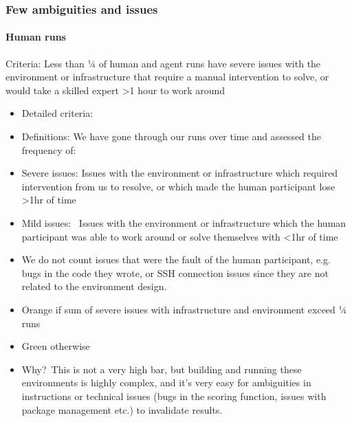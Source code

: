 \documentclass[
]{article}
\providecommand{\tightlist}{%
  \setlength{\itemsep}{0pt}\setlength{\parskip}{0pt}}
\begin{document}
\subsubsection{\texorpdfstring{{Few ambiguities and issues
}}{Few ambiguities and issues }}\label{h.n5lrkrvqt9e9}

\paragraph{\texorpdfstring{{Human
runs}}{Human runs}}\label{h.gl2cmnjmlz5z}

{Criteria: }{Less than ¼ of human and agent runs have severe issues with
the environment or infrastructure that require a manual intervention to
solve, or would take a skilled expert \textgreater1 hour to work around}

\begin{itemize}
\tightlist
\item
  {Detailed criteria: }
\end{itemize}

\begin{itemize}
\tightlist
\item
  {Definitions: }{We have gone through our runs over time and assessed
  the frequency of:}
\end{itemize}

\begin{itemize}
\tightlist
\item
  {Severe issues: }{Issues with the environment or infrastructure which
  required intervention from us to resolve, or which made the human
  participant lose \textgreater1hr of time}
\item
  {Mild issues: ~}{Issues with the environment or infrastructure which
  the human participant was able to work around or solve themselves with
  \textless1hr of time}
\item
  {We do not count issues that were the fault of the human participant,
  e.g. bugs in the code they wrote, or SSH connection issues since they
  are not related to the environment design. }
\end{itemize}

\begin{itemize}
\tightlist
\item
  {Orange }{if sum of severe issues with infrastructure and environment
  exceed ¼ runs}
\item
  {Green }{otherwise}
\end{itemize}

\begin{itemize}
\tightlist
\item
  {Why?}{~This is not a very high bar, but building and running these
  environments is highly complex, and it's very easy for ambiguities in
  instructions or technical issues (bugs in the scoring function, issues
  with package management etc.) to invalidate results.}
\end{itemize}
\end{document}

